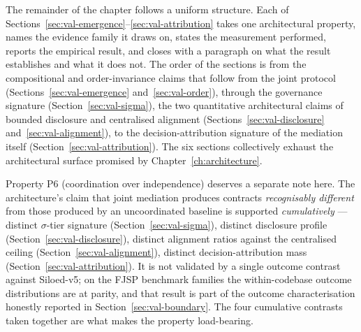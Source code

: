 The remainder of the chapter follows a uniform structure. Each of
Sections~\ref{sec:val-emergence}--\ref{sec:val-attribution} takes
one architectural property, names the evidence family it draws on,
states the measurement performed, reports the empirical result, and
closes with a paragraph on what the result establishes and what it
does not. The order of the sections is from the compositional and
order-invariance claims that follow from the joint protocol
(Sections~\ref{sec:val-emergence} and~\ref{sec:val-order}), through
the governance signature (Section~\ref{sec:val-sigma}), the two
quantitative architectural claims of bounded disclosure and
centralised alignment (Sections~\ref{sec:val-disclosure}
and~\ref{sec:val-alignment}), to the decision-attribution signature
of the mediation itself (Section~\ref{sec:val-attribution}). The
six sections collectively exhaust the architectural surface
promised by Chapter~\ref{ch:architecture}.

Property P6 (coordination over independence) deserves a separate
note here. The architecture's claim that joint mediation produces
contracts \emph{recognisably different} from those produced by an
uncoordinated baseline is supported \emph{cumulatively} ---
distinct $\sigma$-tier signature (Section~\ref{sec:val-sigma}),
distinct disclosure profile (Section~\ref{sec:val-disclosure}),
distinct alignment ratios against the centralised ceiling
(Section~\ref{sec:val-alignment}), distinct decision-attribution
mass (Section~\ref{sec:val-attribution}). It is not validated by a
single outcome contrast against Siloed-v5; on the FJSP benchmark
families the within-codebase outcome distributions are at parity,
and that result is part of the outcome characterisation honestly
reported in Section~\ref{sec:val-boundary}. The four cumulative
contrasts taken together are what makes the property load-bearing.

